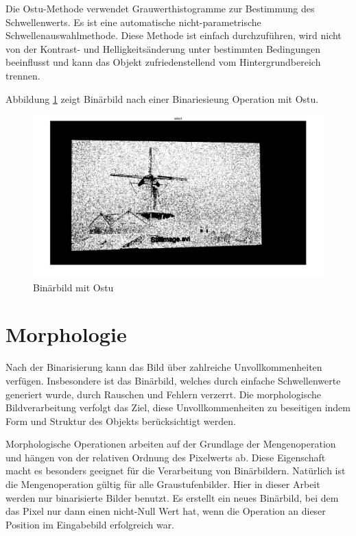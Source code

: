 Die Ostu-Methode verwendet Grauwerthistogramme zur Bestimmung des Schwellenwerts. Es ist eine automatische nicht-parametrische Schwellenauswahlmethode. Diese Methode ist einfach durchzuführen, wird nicht von der Kontrast- und Helligkeitsänderung unter bestimmten Bedingungen beeinflusst und kann das Objekt zufriedenstellend vom Hintergrundbereich trennen.

Abbildung \ref{fig:binarisierungbild} zeigt Binärbild nach einer Binariesieung Operation mit Ostu.

\begin{figure}[H]
 \centering 
  \includegraphics[keepaspectratio,width=1.0\textwidth]{images/4_ZweiteErfahrung/binar/binarisierung.pdf}
 \caption{Binärbild mit Ostu}
 \label{fig:binarisierungbild}
\end{figure} 



\section{Morphologie}

Nach der Binarisierung kann das Bild über zahlreiche Unvollkommenheiten verfügen. Insbesondere ist das Binärbild, welches durch einfache Schwellenwerte generiert wurde, durch Rauschen und Fehlern verzerrt. Die morphologische Bildverarbeitung verfolgt das Ziel, diese Unvollkommenheiten zu beseitigen indem Form und Struktur des Objekts berücksichtigt werden.

Morphologische Operationen arbeiten auf der Grundlage der Mengenoperation und hängen von der relativen Ordnung des Pixelwerts ab. Diese Eigenschaft macht es besonders geeignet für die Verarbeitung von Binärbildern. Natürlich ist die Mengenoperation gültig für alle Graustufenbilder. Hier in dieser Arbeit werden nur binarisierte Bilder benutzt. Es erstellt ein neues Binärbild, bei dem das Pixel nur dann einen nicht-Null Wert hat, wenn die Operation an dieser Position im Eingabebild erfolgreich war.

